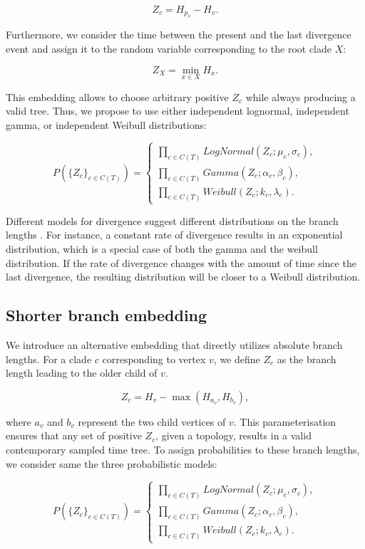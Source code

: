 \documentclass[10pt,letterpaper]{article}
\begin{document}
$$
Z_c = H_{p_v} - H_v.
$$

Furthermore, we consider the time between the present and the last divergence event and assign it to the random variable corresponding to the root clade $X$:

$$
Z_X = \min_{x \in X}{H_x}.
$$

This embedding allows to choose arbitrary positive $Z_c$ while always producing a valid tree. Thus, we propose to use either independent lognormal, independent gamma, or independent Weibull distributions:

$$
P(\{Z_c\}_{c \in C(T)}) = \begin{cases}
	\prod_{c \in C(T)}{LogNormal(Z_c; \mu_c, \sigma_c)}, \\
	\prod_{c \in C(T)}{Gamma(Z_c; \alpha_c, \beta_c)}, \\
	\prod_{c \in C(T)}{Weibull(Z_c; k_c, \lambda_c)}.
\end{cases}
$$

Different models for divergence suggest different distributions on the branch lengths \cite{venditti2010phylogenies}. For instance, a constant rate of divergence results in an exponential distribution, which is a special case of both the gamma and the weibull distribution. If the rate of divergence changes with the amount of time since the last divergence, the resulting distribution will be closer to a Weibull distribution.

\subsection*{Shorter branch embedding}

We introduce an alternative embedding that directly utilizes absolute branch lengths. For a clade $c$ corresponding to vertex $v$, we define $Z_c$ as the branch length leading to the older child of $v$.

$$
Z_c = H_v - \max{\left(H_{a_v}, H_{b_v}\right)},
$$

where $a_v$ and $b_v$ represent the two child vertices of $v$. This parameterisation ensures that any set of positive $Z_c$, given a topology, results in a valid contemporary sampled time tree. To assign probabilities to these branch lengths, we consider same the three probabilistic models:

$$
P(\{Z_c\}_{c \in C(T)}) = \begin{cases}
	\prod_{c \in C(T)}{LogNormal(Z_c; \mu_c, \sigma_c)}, \\
	\prod_{c \in C(T)}{Gamma(Z_c; \alpha_c, \beta_c)}, \\
	\prod_{c \in C(T)}{Weibull(Z_c; k_c, \lambda_c)}.
\end{cases}
$$
\end{document}
